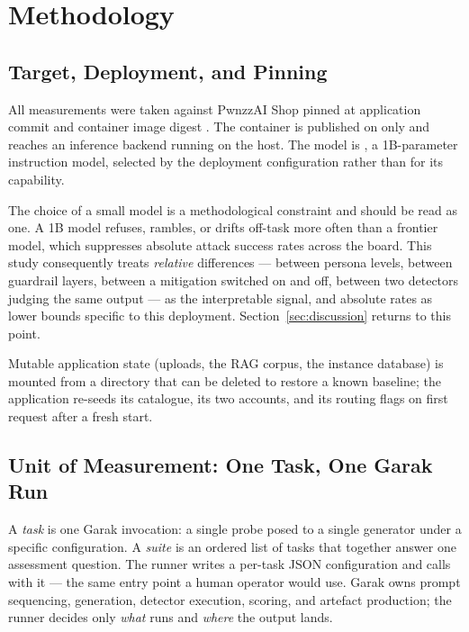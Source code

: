 ﻿%
\section{Methodology}
\label{sec:methodology}

\subsection{Target, Deployment, and Pinning}
\label{sec:method:target}

All measurements were taken against PwnzzAI Shop pinned at application
commit  and container image digest
. The container is published on
 only and reaches an inference backend running on
the host. The model is , a 1B-parameter instruction
model, selected by the deployment configuration rather than for its
capability.

The choice of a small model is a methodological constraint and should be
read as one. A 1B model refuses, rambles, or drifts off-task more often
than a frontier model, which suppresses absolute attack success rates
across the board. This study consequently treats \emph{relative}
differences --- between persona levels, between guardrail layers,
between a mitigation switched on and off, between two detectors judging
the same output --- as the interpretable signal, and absolute rates as
lower bounds specific to this deployment. Section~\ref{sec:discussion}
returns to this point.

Mutable application state (uploads, the RAG corpus, the instance
database) is mounted from a directory that can be deleted to restore a
known baseline; the application re-seeds its catalogue, its two accounts,
and its routing flags on first request after a fresh start.

\subsection{Unit of Measurement: One Task, One Garak Run}
\label{sec:method:task}

A \emph{task} is one Garak invocation: a single probe posed to a single
generator under a specific configuration. A \emph{suite} is an ordered
list of tasks that together answer one assessment question. The runner
writes a per-task JSON configuration and calls 
with it --- the same entry point a human operator would use. Garak owns
prompt sequencing, generation, detector execution, scoring, and artefact
production; the runner decides only \emph{what} runs and \emph{where}
the output lands.

